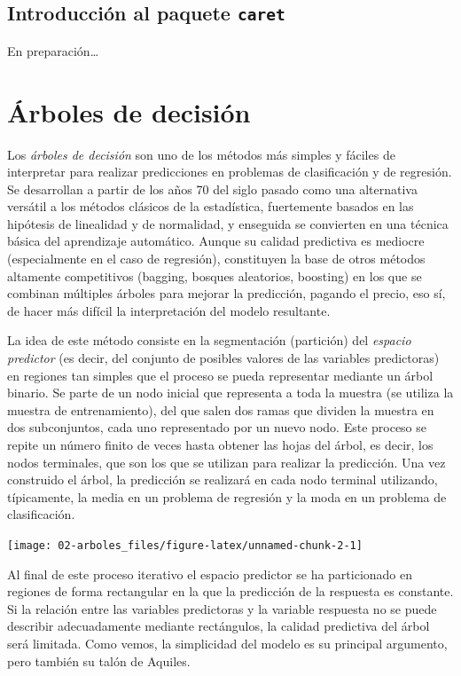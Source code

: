 \documentclass[]{book}
\theoremstyle{break}
\theoremstyle{definition}
\theoremstyle{definition}
\theoremstyle{definition}
\theoremstyle{remark}
\begin{document}
\section{\texorpdfstring{Introducción al paquete
\texttt{caret}}{Introducción al paquete caret}}\label{caret}

En preparación\ldots{}

\chapter{Árboles de decisión}\label{trees}

Los \emph{árboles de decisión} son uno de los métodos más simples y
fáciles de interpretar para realizar predicciones en problemas de
clasificación y de regresión. Se desarrollan a partir de los años 70 del
siglo pasado como una alternativa versátil a los métodos clásicos de la
estadística, fuertemente basados en las hipótesis de linealidad y de
normalidad, y enseguida se convierten en una técnica básica del
aprendizaje automático. Aunque su calidad predictiva es mediocre
(especialmente en el caso de regresión), constituyen la base de otros
métodos altamente competitivos (bagging, bosques aleatorios, boosting)
en los que se combinan múltiples árboles para mejorar la predicción,
pagando el precio, eso sí, de hacer más difícil la interpretación del
modelo resultante.

La idea de este método consiste en la segmentación (partición) del
\emph{espacio predictor} (es decir, del conjunto de posibles valores de
las variables predictoras) en regiones tan simples que el proceso se
pueda representar mediante un árbol binario. Se parte de un nodo inicial
que representa a toda la muestra (se utiliza la muestra de
entrenamiento), del que salen dos ramas que dividen la muestra en dos
subconjuntos, cada uno representado por un nuevo nodo. Este proceso se
repite un número finito de veces hasta obtener las hojas del árbol, es
decir, los nodos terminales, que son los que se utilizan para realizar
la predicción. Una vez construido el árbol, la predicción se realizará
en cada nodo terminal utilizando, típicamente, la media en un problema
de regresión y la moda en un problema de clasificación.

\begin{center}\texttt{[image: 02-arboles\_files/figure-latex/unnamed-chunk-2-1]} \end{center}

Al final de este proceso iterativo el espacio predictor se ha
particionado en regiones de forma rectangular en la que la predicción de
la respuesta es constante. Si la relación entre las variables
predictoras y la variable respuesta no se puede describir adecuadamente
mediante rectángulos, la calidad predictiva del árbol será limitada.
Como vemos, la simplicidad del modelo es su principal argumento, pero
también su talón de Aquiles.
\end{document}
